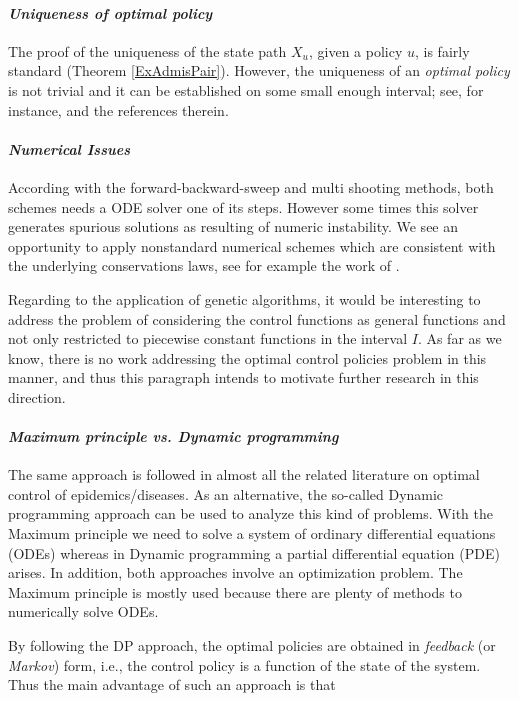 \paragraph{\it Uniqueness of optimal policy}
The proof of the uniqueness of the state path $X_u$, given a policy $u$, is
fairly standard (Theorem \ref{ExAdmisPair}). However, the uniqueness of an 
{\it optimal policy} is not trivial and it can be established on some small 
enough interval; see, for instance, \cite{GaffSchaefer09} and the references 
therein.  
\medskip

\paragraph{\it Numerical Issues}
  According with the forward-backward-sweep and multi shooting methods, both 
schemes needs a ODE solver one of its steps. However some times this solver 
generates spurious solutions as resulting of numeric instability. We see an 
opportunity to  apply nonstandard numerical schemes which are consistent with 
the underlying conservations laws, see for example the work of 
\citet{Mickens2007a}.
  
  Regarding to the application of genetic algorithms, it would be interesting to address the problem of considering the control functions as general 
functions and not only restricted to piecewise constant functions in the 
interval $I$. As far as we know, there is no work addressing  the optimal 
control policies problem in this manner, and thus this paragraph intends to 
motivate further research in this direction.
\medskip

\paragraph{\it Maximum principle vs. Dynamic programming} 
  The same approach is followed in almost all the related literature on optimal
control of epidemics/diseases. As an alternative, the so-called Dynamic
programming approach can be used to analyze this kind of problems. With the
Maximum principle we need to solve a system of ordinary differential equations
(ODEs) whereas in Dynamic programming a partial differential equation (PDE)
arises. In addition, both approaches involve an optimization problem. The
Maximum principle is mostly used because there are plenty of methods to
numerically solve ODEs. 

By following the DP approach, the optimal policies are obtained in {\it feedback} (or {\it Markov}) form, i.e., the control policy is a function of the state of the system. Thus the main advantage of such an approach is that  

